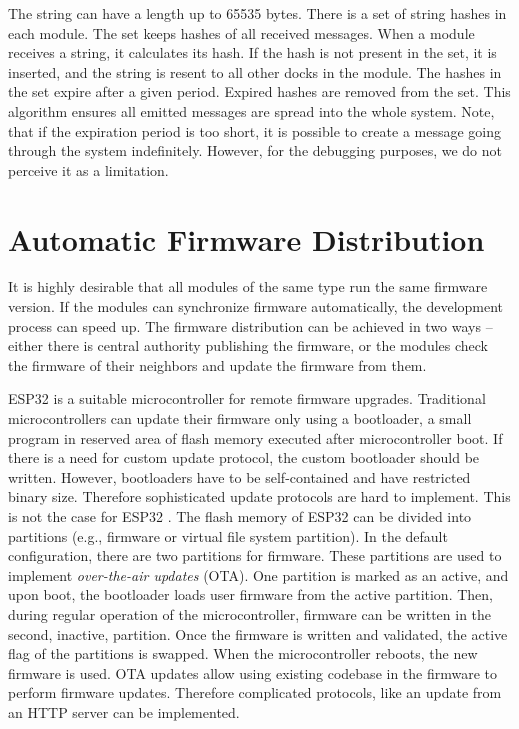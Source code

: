 \noindent The string can have a length up to 65535 bytes. There is a set of
string hashes in each module. The set keeps hashes of all received messages.
When a module receives a string, it calculates its hash. If the hash is not
present in the set, it is inserted, and the string is resent to all other docks
in the module. The hashes in the set expire after a given period. Expired hashes
are removed from the set. This algorithm ensures all emitted messages are spread
into the whole system. Note, that if the expiration period is too short, it is
possible to create a message going through the system indefinitely. However, for
the debugging purposes, we do not perceive it as a limitation.

\section{Automatic Firmware Distribution} \label{sec:firmware_distribution}

It is highly desirable that all modules of the same type run the same firmware
version. If the modules can synchronize firmware automatically, the development
process can speed up. The firmware distribution can be achieved in two ways --
either there is central authority publishing the firmware, or the modules check
the firmware of their neighbors and update the firmware from them.

ESP32 is a suitable microcontroller for remote firmware upgrades. Traditional
microcontrollers can update their firmware only using a bootloader, a small
program in reserved area of flash memory executed after microcontroller boot. If
there is a need for custom update protocol, the custom bootloader should be
written. However, bootloaders have to be self-contained and have restricted
binary size. Therefore sophisticated update protocols are hard to implement.
This is not the case for ESP32 \cite{noauthor_esp-idf_nodate}. The flash memory
of ESP32 can be divided into partitions (e.g., firmware or virtual file system
partition). In the default configuration, there are two partitions for firmware.
These partitions are used to implement \emph{over-the-air updates} (OTA). One
partition is marked as an active, and upon boot, the bootloader loads user
firmware from the active partition. Then, during regular operation of the
microcontroller, firmware can be written in the second, inactive, partition.
Once the firmware is written and validated, the active flag of the partitions is
swapped. When the microcontroller reboots, the new firmware is used. OTA updates
allow using existing codebase in the firmware to perform firmware updates.
Therefore complicated protocols, like an update from an HTTP server can be
implemented.

